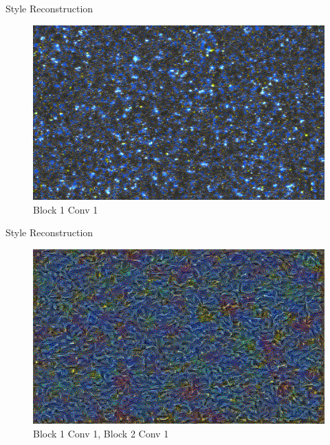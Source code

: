 \documentclass{beamer}
\begin{document}
\begin{frame}{Style Reconstruction}
\begin{figure}[ht]
\centering
\caption{Block 1 Conv 1}
\includegraphics[width=\textwidth]{img/style/block1_conv1.png}
\end{figure}
\end{frame}

\begin{frame}{Style Reconstruction}
\begin{figure}[ht]
\centering
\caption{Block 1 Conv 1, Block 2 Conv 1}
\includegraphics[width=\textwidth]{img/style/block2_conv1.png}
\end{figure}
\end{frame}
\end{document}
